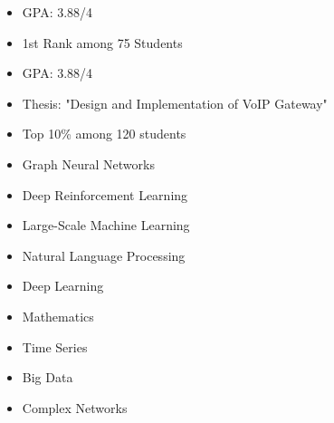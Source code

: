 \documentclass[10pt,a4paper,ragged2e,withhyper]{altacv}
\begin{document}
\vspace*{-1.5\multicolsep}
\divider

\vspace*{-1\multicolsep}
\begin{multicols}{2}
	\begin{itemize}
		\item GPA: 3.88/4
		\item 1st Rank among  75 Students
	\end{itemize}
\end{multicols}

\vspace*{-1.5\multicolsep}
\divider

\vspace*{-1\multicolsep}
\begin{multicols}{2}
	\begin{itemize}
		\item GPA: 3.88/4
		\item Thesis: "Design and Implementation of VoIP Gateway"
		\item  Top 10\% among  120 students
	\end{itemize}
\end{multicols}
\vspace*{-.5\multicolsep}


\vspace*{-1\multicolsep}
\begin{multicols}{3}
	\begin{itemize}
		\item Graph Neural Networks
		\item Deep Reinforcement Learning
		\item  Large-Scale Machine Learning
		\item Natural Language Processing
		\item Deep Learning
		\item Mathematics
		\item Time Series 
		\item Big Data
		\item Complex Networks
		
	\end{itemize}
\end{multicols}
\vspace*{-.5\multicolsep}
\end{document}
